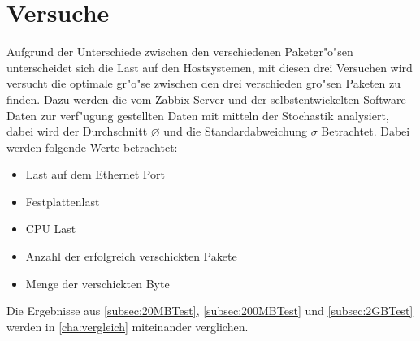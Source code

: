 \chapter{Versuche}
\label{cha:versuche}
Aufgrund der Unterschiede zwischen den verschiedenen Paketgr"o"sen unterscheidet sich die Last auf den Hostsystemen, %
mit diesen drei Versuchen wird versucht die optimale gr"o"se zwischen den drei verschieden gro"sen Paketen zu finden. %
Dazu werden die vom Zabbix Server und der selbstentwickelten Software Daten zur verf"ugung gestellten %
Daten mit mitteln der Stochastik analysiert, dabei wird der Durchschnitt $\diameter $ und die Standardabweichung $\sigma $
Betrachtet. Dabei werden folgende Werte betrachtet:  %
\begin{itemize}
\item Last auf dem Ethernet Port
\item Festplattenlast
\item CPU Last 
\item Anzahl der erfolgreich verschickten Pakete
\item Menge der verschickten Byte
\end{itemize}

Die Ergebnisse aus \cref{subsec:20MBTest}, \cref{subsec:200MBTest} und \cref{subsec:2GBTest} werden %
in \cref{cha:vergleich} miteinander verglichen. %





